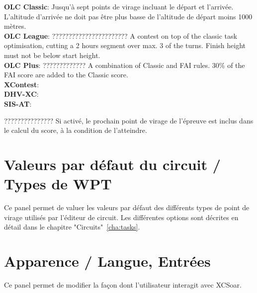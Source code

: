 \begin{description}
  {\bf OLC Classic}: Jusqu'à sept points de virage incluant le départ et l'arrivée. L'altitude d'arrivée ne doit pas être plus basse de l'altitude de départ moins 1000 mètres. \\
  {\bf OLC League}: ??????????????????????? A contest on top of the classic task optimisation, cutting
  a 2 hours segment over max. 3 of the turns. Finish height must not be below
  start height. \\
  {\bf OLC Plus}: ????????????? A combination of Classic and FAI rules. 30\% of the FAI score
  are added to the Classic score. \\
  {\bf XContest}:  \\
  {\bf DHV-XC}:  \\
  {\bf SIS-AT}:  \\
\item[Deviner l'épreuve] ??????????????? Si activé, le prochain point de virage de l'épreuve est inclus dans le calcul du score, à la condition de l'atteindre.
\end{description}

\section{Valeurs par défaut du circuit / Types de WPT}

Ce panel permet de valuer les valeurs par défaut des différents types de point de virage utilisés par l'éditeur de circuit. Les différentes options sont décrites en détail dans le chapitre  "Circuits"~\ref{cha:tasks}.

\section{Apparence / Langue, Entrées}\label{sec:interface}

Ce panel permet de modifier la façon dont l'utilisateur interagit avec XCSoar.

